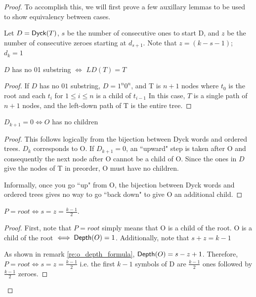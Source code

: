 \begin{proof}
To accomplish this, we will first prove a few auxillary lemmas to be used to show equivalency between cases. 

Let $D=\mathsf{Dyck}{(T)}$, $s$ be the number of consecutive ones to start D, and $z$ be the number of consecutive zeroes starting at $d_{s+1}$.  Note that $z=(k-s-1)$; $d_{k}=1$
\begin{lemma} \label{le:final_case_equivalence}

    $D$ has no 01 substring $\iff$ $LD(T)=T$
\end{lemma}
\begin{proof}


    If $D$ has no $01$ substring, $D=1^n0^n$, and T is $n+1$ nodes where $t_0$ is the root and each $t_i$ for $1\le i \le n$ is a child of $t_{i-1}$  In this case, $T$ is a single path of $n+1$ nodes, and the left-down path of T is the entire tree.
\end{proof}
\begin{lemma} \label{le:no_children_equivalence}
    $D_{k+1} = 0 \iff O$ has no children
\end{lemma}
\begin{proof}

    This follows logically from the bijection between Dyck words and ordered trees.  $D_k$ corresponds to O.  If $D_{k+1}=0$, an ``upward" step is taken after O and consequently the next node after O cannot be a child of O.  Since the ones in $D$ give the nodes of T in preorder, O must have no children.

    Informally, once you go ``up" from O, the bijection between Dyck words and ordered trees gives no way to go ``back down" to give O an additional child.
\end{proof}
\begin{lemma} \label{le:tight_case_equivalence}
    $P=root \iff s=z=\frac{k-1}{2}$.
\end{lemma}
\begin{proof}

    First, note that $P=root$ simply means that O is a child of the root.  O is a child of the root $\iff \mathsf{Depth}{(O)}=1$.  Additionally, note that $s+z=k-1$

    As shown in remark \ref{re:o_depth_formula}, $\mathsf{Depth}{(O)}=s-z+1$. Therefore, $P=root \iff s=z=\frac{k-1}{2}$
    i.e. the first $k-1$ symbols of D are $\frac{k-1}{2}$ ones followed by $\frac{k-1}{2}$ zeroes. 



\end{proof}
\end{proof}
